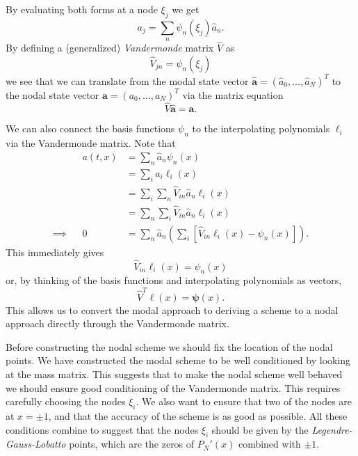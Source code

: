 By evaluating both forms at a node $\xi_j$ we get
%
\begin{equation}
  \label{eq:dg_nodal_vandermonde1}
  a_j = \sum_n \psi_n(\xi_j) \hat{a}_n.
\end{equation}
%
By defining a (generalized) \emph{Vandermonde} matrix $\hat{V}$ as
%
\begin{equation}
  \label{eq:dg_nodal_vandermonde2}
  \hat{V}_{jn} = \psi_n(\xi_j)
\end{equation}
%
we see that we can translate from the modal state vector
$\mathbf{\hat{a}} = (\hat{a}_0, \dots, \hat{a}_N)^T$ to the nodal state vector
$\mathbf{a} = (a_0, \dots, a_N)^T$ via the matrix equation
%
\begin{equation}
  \label{eq:dg_nodal_vandermonde3}
  \hat{V} \mathbf{\hat{a}} = \mathbf{a}.
\end{equation}

We can also connect the basis functions $\psi_n$ to the interpolating polynomials
$\ell_i$ via the Vandermonde matrix. Note that
%
\begin{subequations}
  \label{eq:dg_nodal_vandermonde4}
  \begin{align}
      && a(t, x) &= \sum_n \hat{a}_n \psi_n(x) \\
      && &= \sum_i a_i \ell_i(x) \\
      && &= \sum_i \sum_n \hat{V}_{in} \hat{a}_n \ell_i(x) \\
      && &= \sum_n \sum_i \hat{V}_{in} \hat{a}_n \ell_i(x) \\
      \implies && 0 &= \sum_n \hat{a}_n \left( \sum_i \left[ \hat{V}_{in} \ell_i(x) - \psi_n(x) \right] \right).
  \end{align}
\end{subequations}
%
This immediately gives
%
\begin{equation}
  \label{eq:dg_nodal_vandermonde5}
  \hat{V}_{in} \ell_i(x) = \psi_n(x)
\end{equation}
%
or, by thinking of the basis functions and interpolating polynomials as vectors,
%
\begin{equation}
  \label{eq:dg_nodal_vandermonde6}
  \hat{V}^T \mathbf{\ell}(x) = \mathbf{\psi}(x).
\end{equation}
%
This allows us to convert the modal approach to deriving a scheme to a nodal
approach directly through the Vandermonde matrix.

Before constructing the nodal scheme we should fix the location of the nodal
points. We have constructed the modal scheme to be well conditioned by looking
at the mass matrix. This suggests that to make the nodal scheme well behaved we
should ensure good conditioning of the Vandermonde matrix. This requires
carefully choosing the nodes $\xi_i$. We also want to ensure that two of the
nodes are at $x = \pm 1$, and that the accuracy of the scheme is as good as
possible. All these conditions combine to suggest that the nodes $\xi_i$ should
be given by the \emph{Legendre-Gauss-Lobatto} points, which are the zeros of
$P_N'(x)$ combined with $\pm 1$.



